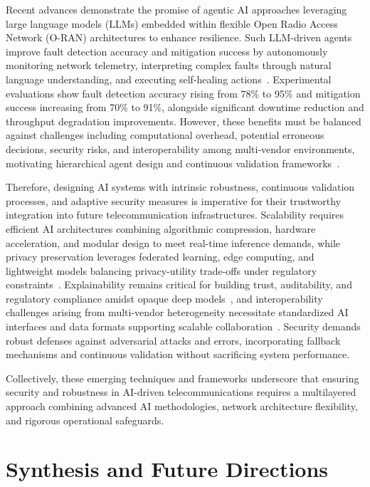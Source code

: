 \documentclass[sigconf]{acmart}
\begin{document}
Recent advances demonstrate the promise of agentic AI approaches leveraging large language models (LLMs) embedded within flexible Open Radio Access Network (O-RAN) architectures to enhance resilience. Such LLM-driven agents improve fault detection accuracy and mitigation success by autonomously monitoring network telemetry, interpreting complex faults through natural language understanding, and executing self-healing actions~\cite{ref55}. Experimental evaluations show fault detection accuracy rising from 78\% to 95\% and mitigation success increasing from 70\% to 91\%, alongside significant downtime reduction and throughput degradation improvements. However, these benefits must be balanced against challenges including computational overhead, potential erroneous decisions, security risks, and interoperability among multi-vendor environments, motivating hierarchical agent design and continuous validation frameworks~\cite{ref55}.

Therefore, designing AI systems with intrinsic robustness, continuous validation processes, and adaptive security measures is imperative for their trustworthy integration into future telecommunication infrastructures. Scalability requires efficient AI architectures combining algorithmic compression, hardware acceleration, and modular design to meet real-time inference demands, while privacy preservation leverages federated learning, edge computing, and lightweight models balancing privacy-utility trade-offs under regulatory constraints~\cite{ref48,ref50}. Explainability remains critical for building trust, auditability, and regulatory compliance amidst opaque deep models~\cite{ref50}, and interoperability challenges arising from multi-vendor heterogeneity necessitate standardized AI interfaces and data formats supporting scalable collaboration~\cite{ref55}. Security demands robust defenses against adversarial attacks and errors, incorporating fallback mechanisms and continuous validation without sacrificing system performance.

Collectively, these emerging techniques and frameworks underscore that ensuring security and robustness in AI-driven telecommunications requires a multilayered approach combining advanced AI methodologies, network architecture flexibility, and rigorous operational safeguards.

\section{Synthesis and Future Directions}
\end{document}
